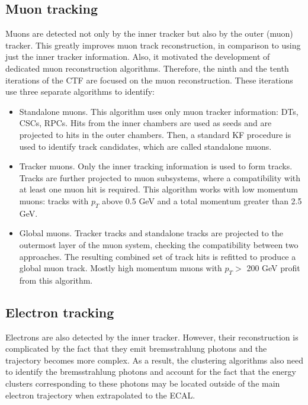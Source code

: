 \subsection{Muon tracking}\label{sec:muon_track_reconstruction}

Muons are detected not only by the inner tracker but also by the outer (muon) tracker. This greatly improves muon track reconstruction, in comparison to using just the inner tracker information. Also, it motivated the development of dedicated muon reconstruction algorithms. Therefore, the ninth and the tenth iterations of the CTF are focused on the muon reconstruction. These iterations use three separate algorithms to identify: 

\begin{itemize}
\item Standalone muons. This algorithm uses only muon tracker information: DTs, CSCs, RPCs. Hits from the inner chambers are used as seeds and are projected to hits in the outer chambers. Then, a standard KF procedure is used to identify track candidates, which are called standalone muons.
\item Tracker muons. Only the inner tracking information is used to form tracks. Tracks are further projected to muon subsystems, where a compatibility with at least one muon hit is required. This algorithm works with low momentum muons: tracks with $p_T$ above 0.5 GeV and a total momentum greater than 2.5 GeV.
\item Global muons. Tracker tracks and standalone tracks are projected to the outermost layer of the muon system, checking the compatibility between two approaches. The resulting combined set of track hits is refitted to produce a global muon track. Mostly high momentum muons with $p_T > $ 200 GeV profit from this algorithm.
\end{itemize}

\subsection{Electron tracking}\label{sec:ele_track_reconstruction}
Electrons are also detected by the inner tracker. However, their reconstruction is complicated by the fact that they emit bremsstrahlung photons and the trajectory becomes more complex. As a result, the clustering algorithms also need to identify the bremsstrahlung photons and account for the fact that the energy clusters corresponding to these photons may be located outside of the main electron trajectory when extrapolated to the ECAL. 

